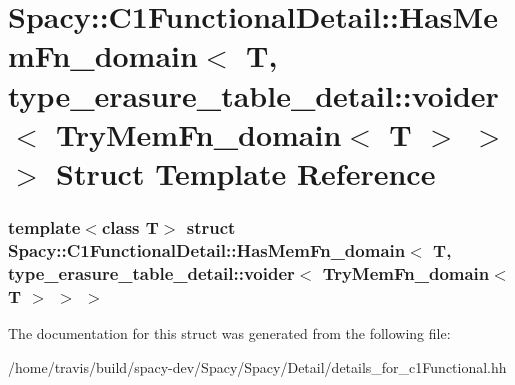 \hypertarget{structSpacy_1_1C1FunctionalDetail_1_1HasMemFn__domain_3_01T_00_01type__erasure__table__detail_1_b7eb725744f04d64d193dc00cae470e0}{\section{\-Spacy\-:\-:\-C1\-Functional\-Detail\-:\-:\-Has\-Mem\-Fn\-\_\-domain$<$ \-T, type\-\_\-erasure\-\_\-table\-\_\-detail\-:\-:voider$<$ \-Try\-Mem\-Fn\-\_\-domain$<$ \-T $>$ $>$ $>$ \-Struct \-Template \-Reference}
\label{structSpacy_1_1C1FunctionalDetail_1_1HasMemFn__domain_3_01T_00_01type__erasure__table__detail_1_b7eb725744f04d64d193dc00cae470e0}
}
\subsubsection*{template$<$class T$>$ struct Spacy\-::\-C1\-Functional\-Detail\-::\-Has\-Mem\-Fn\-\_\-domain$<$ T, type\-\_\-erasure\-\_\-table\-\_\-detail\-::voider$<$ Try\-Mem\-Fn\-\_\-domain$<$ T $>$ $>$ $>$}



\-The documentation for this struct was generated from the following file\-:\begin{DoxyCompactItemize}
\item 
/home/travis/build/spacy-\/dev/\-Spacy/\-Spacy/\-Detail/details\-\_\-for\-\_\-c1\-Functional.\-hh\end{DoxyCompactItemize}
